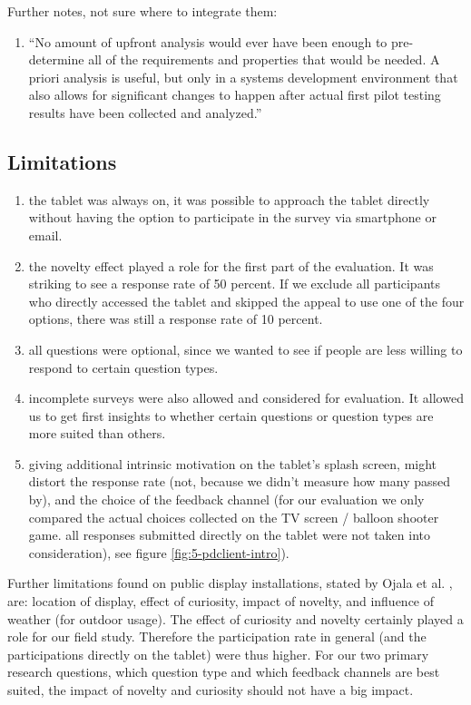 	Further notes, not sure where to integrate them:
	\begin{enumerate}
	\item ``No amount of upfront analysis would ever have been enough to pre- determine all of the requirements and properties that would be needed. A priori analysis is useful, but only in a systems development environment that also allows for significant changes to happen after actual first pilot testing results have been collected and analyzed.'' \cite{russell2004use}
	\end{enumerate}










\subsection{Limitations}

	\begin{enumerate}
	\item the tablet was always on, it was possible to approach the tablet directly without having the option to participate in the survey via smartphone or email. 
	\item the novelty effect played a role for the first part of the evaluation. It was striking to see a response rate of 50 percent. If we exclude all participants who directly accessed the tablet and skipped the appeal to use one of the four options, there was still a response rate of 10 percent.
	\item all questions were optional, since we wanted to see if people are less willing to respond to certain question types.
	\item incomplete surveys were also allowed and considered for evaluation. It allowed us to get first insights to whether certain questions or question types are more suited than others.
	\item giving additional intrinsic motivation on the tablet's splash screen, might distort the response rate (not, because we didn't measure how many passed by), and the choice of the feedback channel (for our evaluation we only compared the actual choices collected on the TV screen / balloon shooter game. all responses submitted directly on the tablet were not taken into consideration), see figure \ref{fig:5-pdclient-intro}).
	\end{enumerate}

	Further limitations found on public display installations, stated by Ojala et al. \cite{Ojala2011}, are: location of display, effect of curiosity, impact of novelty, and influence of weather (for outdoor usage). The effect of curiosity and novelty certainly played a role for our field study. Therefore the participation rate in general (and the participations directly on the tablet) were thus higher. For our two primary research questions, which question type and which feedback channels are best suited, the impact of novelty and curiosity should not have a big impact.

